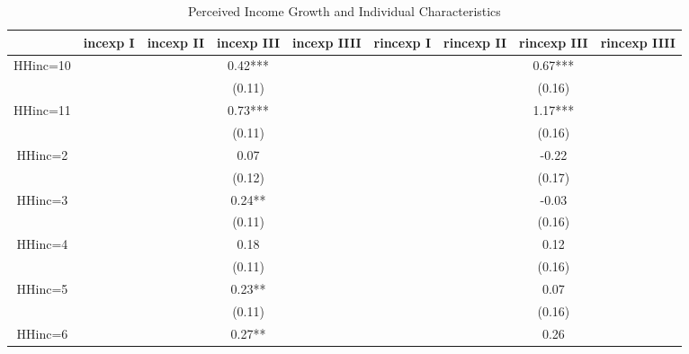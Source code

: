 
\begin{table}[ht]
\centering
\begin{adjustbox}{width={0.9\textwidth},totalheight={\textheight}}
\begin{threeparttable}
\caption{Perceived Income Growth and Individual Characteristics}
\label{micro_reg_exp}\begin{tabular}{ccccccccc}
\toprule
{} &  incexp I & incexp II & incexp III & incexp IIII & rincexp I & rincexp II & rincexp III & rincexp IIII \\
\midrule
HHinc=10     &           &           &    0.42*** &             &           &            &     0.67*** &              \\
             &           &           &     (0.11) &             &           &            &      (0.16) &              \\
HHinc=11     &           &           &    0.73*** &             &           &            &     1.17*** &              \\
             &           &           &     (0.11) &             &           &            &      (0.16) &              \\
HHinc=2      &           &           &       0.07 &             &           &            &       -0.22 &              \\
             &           &           &     (0.12) &             &           &            &      (0.17) &              \\
HHinc=3      &           &           &     0.24** &             &           &            &       -0.03 &              \\
             &           &           &     (0.11) &             &           &            &      (0.16) &              \\
HHinc=4      &           &           &       0.18 &             &           &            &        0.12 &              \\
             &           &           &     (0.11) &             &           &            &      (0.16) &              \\
HHinc=5      &           &           &     0.23** &             &           &            &        0.07 &              \\
             &           &           &     (0.11) &             &           &            &      (0.16) &              \\
HHinc=6      &           &           &     0.27** &             &           &            &        0.26 &              \\

\end{tabular}
\end{threeparttable}
\end{adjustbox}
\end{table}
